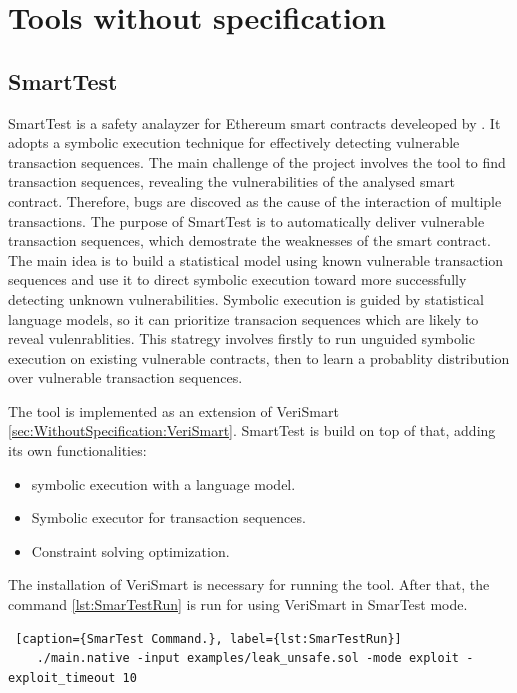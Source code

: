 \section{Tools without specification}
\label{sec:Tools:WithoutSpecification}

\subsection{SmartTest}
\label{sec:WithoutSpecification:SmartTest}

SmartTest is a safety analayzer for Ethereum smart contracts develeoped by \citet{SmarTest}. 
It adopts a symbolic execution technique for effectively detecting vulnerable transaction sequences. 
The main challenge of the project involves the tool to find transaction sequences,
revealing the vulnerabilities of the analysed smart contract. Therefore, bugs are discoved as the cause of the interaction of multiple transactions.
The purpose of SmartTest is to automatically deliver vulnerable transaction sequences, 
which demostrate the weaknesses of the smart contract.
The main idea is to build a statistical model using known vulnerable transaction sequences and use it to direct symbolic execution toward 
more successfully detecting unknown vulnerabilities. 
Symbolic execution is guided by statistical language models, so it can prioritize transacion sequences which are likely to reveal vulenrablities.
This statregy involves firstly to run unguided symbolic
execution on existing vulnerable contracts, then to learn a probablity distribution over vulnerable transaction sequences.

The tool is implemented as an extension of VeriSmart \autoref{sec:WithoutSpecification:VeriSmart}.
SmartTest is build on top of that, adding its own functionalities:
\begin{itemize}
    \item symbolic execution with a language model.
    \item Symbolic executor for transaction sequences.
    \item Constraint solving optimization.
\end{itemize}
The installation of VeriSmart is necessary for running the tool. After that, the command \autoref{lst:SmarTestRun} is run for using VeriSmart in SmarTest mode.
\begin{lstlisting} [caption={SmarTest Command.}, label={lst:SmarTestRun}]
    ./main.native -input examples/leak_unsafe.sol -mode exploit -exploit_timeout 10
\end{lstlisting}

